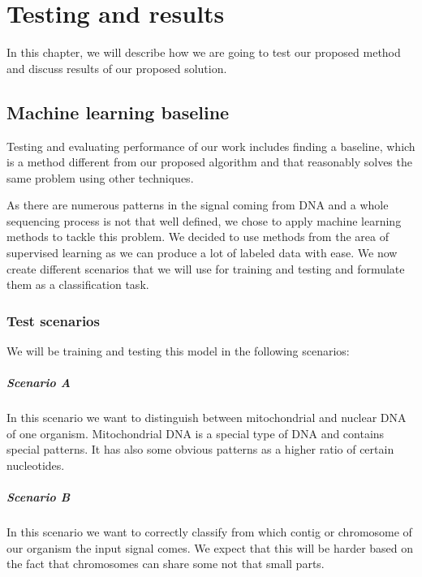 \chapter{Testing and results}

\label{kap:testRes} %

In this chapter, we will describe how we are going to test our proposed method
and discuss results of our proposed solution.

\section{Machine learning baseline}

Testing and evaluating performance of our work includes finding a baseline,
which is a method different from our proposed
algorithm and that reasonably solves the same problem using other techniques.

As there are numerous patterns in the signal coming from DNA and a whole sequencing
process is not that well defined, we chose to apply machine learning methods to
tackle this problem. We decided to use methods from the area of supervised learning
as we can produce a lot of labeled data with ease. We now create different scenarios
that we will use for training and testing and formulate them as a classification task.

\subsection{Test scenarios}

We will be training and testing this model in the following scenarios:

\paragraph{Scenario A} In this scenario we want to distinguish between mitochondrial
and nuclear DNA of one organism. Mitochondrial DNA is a special type of DNA and
contains special patterns. It has also some obvious patterns as a higher ratio of
certain nucleotides.

\paragraph{Scenario B} In this scenario we want to correctly classify from which
contig or chromosome of our organism the input signal comes. We expect that this
will be harder based on the fact that chromosomes can share some not that small parts.


